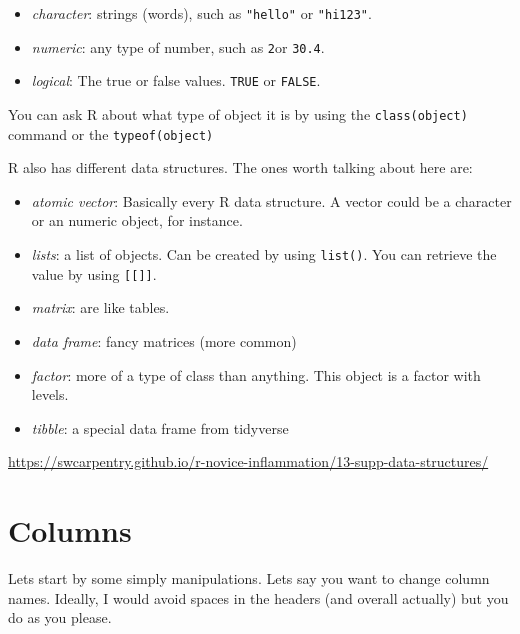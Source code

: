 \documentclass[
]{book}
\providecommand{\tightlist}{%
  \setlength{\itemsep}{0pt}\setlength{\parskip}{0pt}}
\begin{document}
\begin{itemize}
\tightlist
\item
  \emph{character}: strings (words), such as \texttt{"hello"} or \texttt{"hi123"}.\\
\item
  \emph{numeric}: any type of number, such as \texttt{2}or \texttt{30.4}.\\
\item
  \emph{logical}: The true or false values. \texttt{TRUE} or \texttt{FALSE}.
\end{itemize}

You can ask R about what type of object it is by using the \texttt{class(object)} command or the \texttt{typeof(object)}

R also has different data structures. The ones worth talking about here are:

\begin{itemize}
\tightlist
\item
  \emph{atomic vector}: Basically every R data structure. A vector could be a character or an numeric object, for instance.
\item
  \emph{lists}: a list of objects. Can be created by using \texttt{list()}. You can retrieve the value by using \texttt{{[}{[}{]}{]}}.
\item
  \emph{matrix}: are like tables.
\item
  \emph{data frame}: fancy matrices (more common)
\item
  \emph{factor}: more of a type of class than anything. This object is a factor with levels.
\item
  \emph{tibble}: a special data frame from tidyverse
\end{itemize}

\url{https://swcarpentry.github.io/r-novice-inflammation/13-supp-data-structures/}

\hypertarget{columns}{%
\section{Columns}\label{columns}}

Lets start by some simply manipulations. Lets say you want to change column names. Ideally, I would avoid spaces in the headers (and overall actually) but you do as you please.
\end{document}
